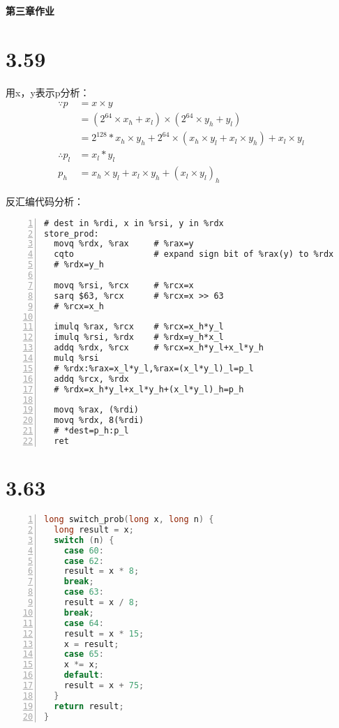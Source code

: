 \documentclass[11pt]{article}
\begin{document}
\begin{center}
  \textbf{\Huge{第三章作业}}
\end{center}

\section*{3.59}
用x，y表示p分析：
\begin{align*}
  \because p &= x \times y \\
  &= (2^{ 64} \times x_h + x_l) \times (2 ^ {64} \times y_h + y_l) \\
  &= 2^{128} * x_h \times y_h + 2^{64} \times (x_h \times y_l + x_l \times y_h)
  + x_l \times y_l \\
  \therefore p_l &= x_l * y_l \\
  p_h &= x_h \times y_l + x_l \times y_h + (x_l \times y_l)_h
\end{align*}

反汇编代码分析：

\begin{lstlisting}[breaklines=true,captionpos=b,tabsize=2,numbers=left,columns=fullflexible,keepspaces=true]
# dest in %rdi, x in %rsi, y in %rdx
store_prod:
  movq %rdx, %rax     # %rax=y
  cqto                # expand sign bit of %rax(y) to %rdx
  # %rdx=y_h

  movq %rsi, %rcx     # %rcx=x
  sarq $63, %rcx      # %rcx=x >> 63
  # %rcx=x_h

  imulq %rax, %rcx    # %rcx=x_h*y_l
  imulq %rsi, %rdx    # %rdx=y_h*x_l
  addq %rdx, %rcx     # %rcx=x_h*y_l+x_l*y_h
  mulq %rsi
  # %rdx:%rax=x_l*y_l,%rax=(x_l*y_l)_l=p_l
  addq %rcx, %rdx
  # %rdx=x_h*y_l+x_l*y_h+(x_l*y_l)_h=p_h

  movq %rax, (%rdi)
  movq %rdx, 8(%rdi)
  # *dest=p_h:p_l
  ret
\end{lstlisting}

\section*{3.63}

\begin{lstlisting}[language=c++,breaklines=true,captionpos=b,tabsize=2,numbers=left,columns=fullflexible,keepspaces=true]
long switch_prob(long x, long n) {
  long result = x;
  switch (n) {
    case 60:
    case 62:
    result = x * 8;
    break;
    case 63:
    result = x / 8;
    break;
    case 64:
    result = x * 15;
    x = result;
    case 65:
    x *= x;
    default:
    result = x + 75;
  }
  return result;
}
\end{lstlisting}
\end{document}
